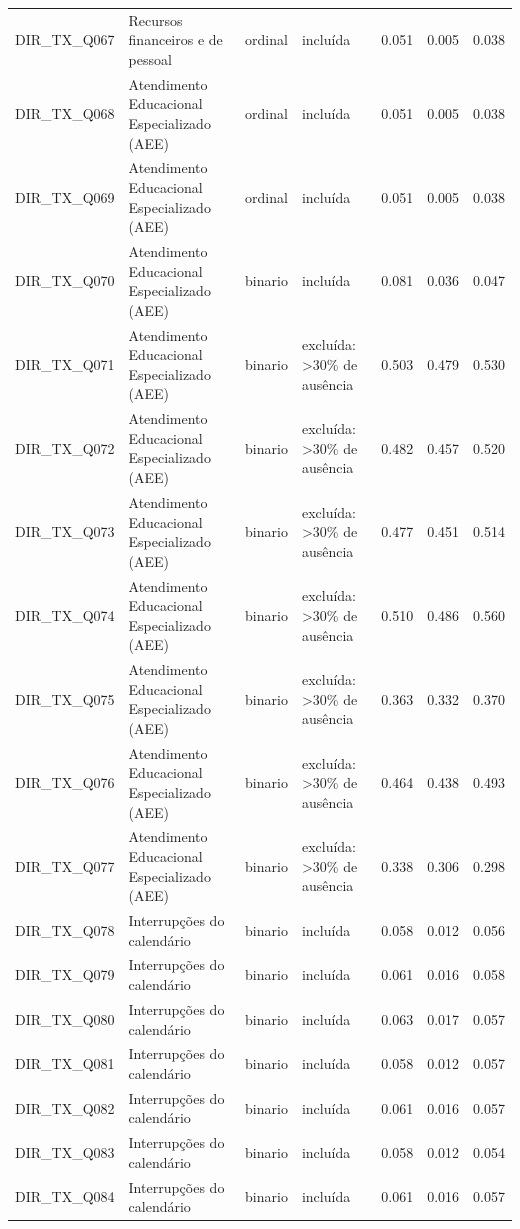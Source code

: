\begin{tabular}{llllrrr}
DIR\_TX\_Q067 & Recursos financeiros e de pessoal & ordinal & incluída & 0.051 & 0.005 & 0.038 \\
DIR\_TX\_Q068 & Atendimento Educacional Especializado (AEE) & ordinal & incluída & 0.051 & 0.005 & 0.038 \\
DIR\_TX\_Q069 & Atendimento Educacional Especializado (AEE) & ordinal & incluída & 0.051 & 0.005 & 0.038 \\
DIR\_TX\_Q070 & Atendimento Educacional Especializado (AEE) & binario & incluída & 0.081 & 0.036 & 0.047 \\
DIR\_TX\_Q071 & Atendimento Educacional Especializado (AEE) & binario & excluída: >30\% de ausência & 0.503 & 0.479 & 0.530 \\
DIR\_TX\_Q072 & Atendimento Educacional Especializado (AEE) & binario & excluída: >30\% de ausência & 0.482 & 0.457 & 0.520 \\
DIR\_TX\_Q073 & Atendimento Educacional Especializado (AEE) & binario & excluída: >30\% de ausência & 0.477 & 0.451 & 0.514 \\
DIR\_TX\_Q074 & Atendimento Educacional Especializado (AEE) & binario & excluída: >30\% de ausência & 0.510 & 0.486 & 0.560 \\
DIR\_TX\_Q075 & Atendimento Educacional Especializado (AEE) & binario & excluída: >30\% de ausência & 0.363 & 0.332 & 0.370 \\
DIR\_TX\_Q076 & Atendimento Educacional Especializado (AEE) & binario & excluída: >30\% de ausência & 0.464 & 0.438 & 0.493 \\
DIR\_TX\_Q077 & Atendimento Educacional Especializado (AEE) & binario & excluída: >30\% de ausência & 0.338 & 0.306 & 0.298 \\
DIR\_TX\_Q078 & Interrupções do calendário & binario & incluída & 0.058 & 0.012 & 0.056 \\
DIR\_TX\_Q079 & Interrupções do calendário & binario & incluída & 0.061 & 0.016 & 0.058 \\
DIR\_TX\_Q080 & Interrupções do calendário & binario & incluída & 0.063 & 0.017 & 0.057 \\
DIR\_TX\_Q081 & Interrupções do calendário & binario & incluída & 0.058 & 0.012 & 0.057 \\
DIR\_TX\_Q082 & Interrupções do calendário & binario & incluída & 0.061 & 0.016 & 0.057 \\
DIR\_TX\_Q083 & Interrupções do calendário & binario & incluída & 0.058 & 0.012 & 0.054 \\
DIR\_TX\_Q084 & Interrupções do calendário & binario & incluída & 0.061 & 0.016 & 0.057 \\

\end{tabular}
